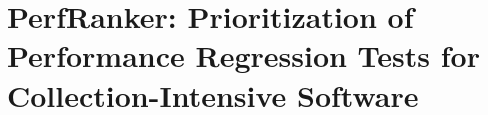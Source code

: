 
\chapter{PerfRanker: Prioritization of Performance Regression Tests for Collection-Intensive Software}









